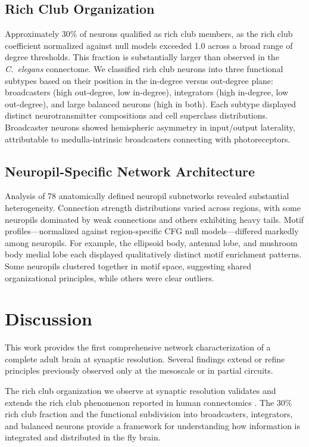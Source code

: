 \documentclass[11pt]{article}
\begin{document}
\subsection{Rich Club Organization}

Approximately 30\% of neurons qualified as rich club members, as the rich club coefficient normalized against null models exceeded 1.0 across a broad range of degree thresholds. This fraction is substantially larger than observed in the \textit{C.\ elegans} connectome. We classified rich club neurons into three functional subtypes based on their position in the in-degree versus out-degree plane: broadcasters (high out-degree, low in-degree), integrators (high in-degree, low out-degree), and large balanced neurons (high in both). Each subtype displayed distinct neurotransmitter compositions and cell superclass distributions. Broadcaster neurons showed hemispheric asymmetry in input/output laterality, attributable to medulla-intrinsic broadcasters connecting with photoreceptors.

\subsection{Neuropil-Specific Network Architecture}

Analysis of 78 anatomically defined neuropil subnetworks revealed substantial heterogeneity. Connection strength distributions varied across regions, with some neuropils dominated by weak connections and others exhibiting heavy tails. Motif profiles---normalized against region-specific CFG null models---differed markedly among neuropils. For example, the ellipsoid body, antennal lobe, and mushroom body medial lobe each displayed qualitatively distinct motif enrichment patterns. Some neuropils clustered together in motif space, suggesting shared organizational principles, while others were clear outliers.

\section{Discussion}

This work provides the first comprehensive network characterization of a complete adult brain at synaptic resolution. Several findings extend or refine principles previously observed only at the mesoscale or in partial circuits.

The rich club organization we observe at synaptic resolution validates and extends the rich club phenomenon reported in human connectomics \citep{vandenHeuvel2011rich}. The 30\% rich club fraction and the functional subdivision into broadcasters, integrators, and balanced neurons provide a framework for understanding how information is integrated and distributed in the fly brain.
\end{document}
